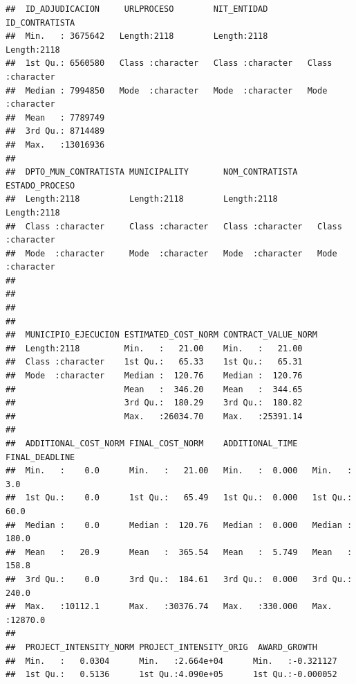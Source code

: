 \documentclass[
]{article}
\begin{document}
\begin{verbatim}
##  ID_ADJUDICACION     URLPROCESO        NIT_ENTIDAD        ID_CONTRATISTA    
##  Min.   : 3675642   Length:2118        Length:2118        Length:2118       
##  1st Qu.: 6560580   Class :character   Class :character   Class :character  
##  Median : 7994850   Mode  :character   Mode  :character   Mode  :character  
##  Mean   : 7789749                                                           
##  3rd Qu.: 8714489                                                           
##  Max.   :13016936                                                           
##                                                                             
##  DPTO_MUN_CONTRATISTA MUNICIPALITY       NOM_CONTRATISTA    ESTADO_PROCESO    
##  Length:2118          Length:2118        Length:2118        Length:2118       
##  Class :character     Class :character   Class :character   Class :character  
##  Mode  :character     Mode  :character   Mode  :character   Mode  :character  
##                                                                               
##                                                                               
##                                                                               
##                                                                               
##  MUNICIPIO_EJECUCION ESTIMATED_COST_NORM CONTRACT_VALUE_NORM
##  Length:2118         Min.   :   21.00    Min.   :   21.00   
##  Class :character    1st Qu.:   65.33    1st Qu.:   65.31   
##  Mode  :character    Median :  120.76    Median :  120.76   
##                      Mean   :  346.20    Mean   :  344.65   
##                      3rd Qu.:  180.29    3rd Qu.:  180.82   
##                      Max.   :26034.70    Max.   :25391.14   
##                                                             
##  ADDITIONAL_COST_NORM FINAL_COST_NORM    ADDITIONAL_TIME   FINAL_DEADLINE   
##  Min.   :    0.0      Min.   :   21.00   Min.   :  0.000   Min.   :    3.0  
##  1st Qu.:    0.0      1st Qu.:   65.49   1st Qu.:  0.000   1st Qu.:   60.0  
##  Median :    0.0      Median :  120.76   Median :  0.000   Median :  180.0  
##  Mean   :   20.9      Mean   :  365.54   Mean   :  5.749   Mean   :  158.8  
##  3rd Qu.:    0.0      3rd Qu.:  184.61   3rd Qu.:  0.000   3rd Qu.:  240.0  
##  Max.   :10112.1      Max.   :30376.74   Max.   :330.000   Max.   :12870.0  
##                                                                             
##  PROJECT_INTENSITY_NORM PROJECT_INTENSITY_ORIG  AWARD_GROWTH      
##  Min.   :   0.0304      Min.   :2.664e+04      Min.   :-0.321127  
##  1st Qu.:   0.5136      1st Qu.:4.090e+05      1st Qu.:-0.000052  

\end{verbatim}
\end{document}
